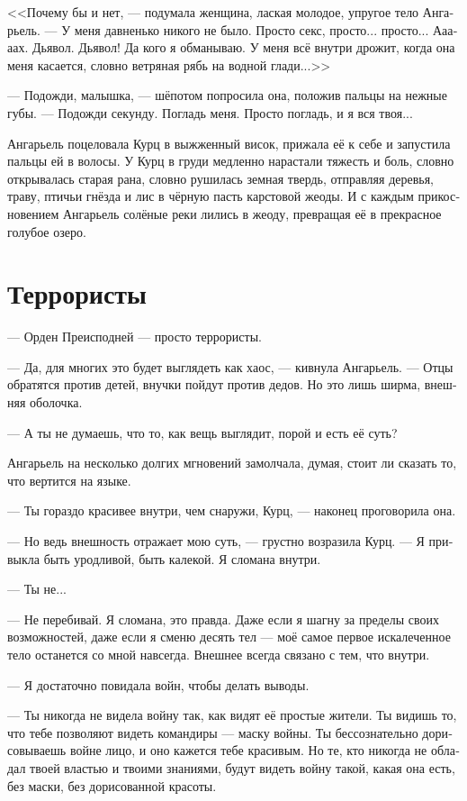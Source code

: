 \documentclass[a4paper,12pt,fleqn]{book}\usepackage{cooltooltips}\usepackage{polyglossia}\setdefaultlanguage[babelshorthands=true]{russian}\setotherlanguage{english}\defaultfontfeatures{Ligatures=TeX,Mapping=tex-text} \usepackage{xcolor}\definecolor{lightgray}{HTML}{bbbbbb}\color{lightgray}\newcommand{\ml}[3]{\textenglish{\textcolor{black}{#3}}}
\begin{document}
<<Почему бы и нет, --- подумала женщина, лаская молодое, упругое тело Ангарьель.
--- У меня давненько никого не было.
Просто секс, просто... просто...
Ааааах.
Дьявол.
Дьявол!
Да кого я обманываю.
У меня всё внутри дрожит, когда она меня касается, словно ветряная рябь на водной глади...>>

--- Подожди, малышка, --- шёпотом попросила она, положив пальцы на нежные губы.
--- Подожди секунду.
Погладь меня.
Просто погладь, и я вся твоя...

Ангарьель поцеловала Курц в выжженный висок, прижала её к себе и запустила пальцы ей в волосы.
У Курц в груди медленно нарастали тяжесть и боль, словно открывалась старая рана, словно рушилась земная твердь, отправляя деревья, траву, птичьи гнёзда и лис в чёрную пасть карстовой жеоды.
И с каждым прикосновением Ангарьель солёные реки лились в жеоду, превращая её в прекрасное голубое озеро.

\section{Террористы}

--- Орден Преисподней --- просто террористы.

--- Да, для многих это будет выглядеть как хаос, --- кивнула Ангарьель.
--- Отцы обратятся против детей, внучки пойдут против дедов.
Но это лишь ширма, внешняя оболочка.

--- А ты не думаешь, что то, как вещь выглядит, порой и есть её суть?

Ангарьель на несколько долгих мгновений замолчала, думая, стоит ли сказать то, что вертится на языке.

--- Ты гораздо красивее внутри, чем снаружи, Курц, --- наконец проговорила она.

--- Но ведь внешность отражает мою суть, --- грустно возразила Курц.
--- Я привыкла быть уродливой, быть калекой.
Я сломана внутри.

--- Ты не...

--- Не перебивай.
Я сломана, это правда.
Даже если я шагну за пределы своих возможностей, даже если я сменю десять тел --- моё самое первое искалеченное тело останется со мной навсегда.
Внешнее всегда связано с тем, что внутри.

--- Я достаточно повидала войн, чтобы делать выводы.

--- Ты никогда не видела войну так, как видят её простые жители.
Ты видишь то, что тебе позволяют видеть командиры --- маску войны.
Ты бессознательно дорисовываешь войне лицо, и оно кажется тебе красивым.
Но те, кто никогда не обладал твоей властью и твоими знаниями, будут видеть войну такой, какая она есть, без маски, без дорисованной красоты.
\end{document}
